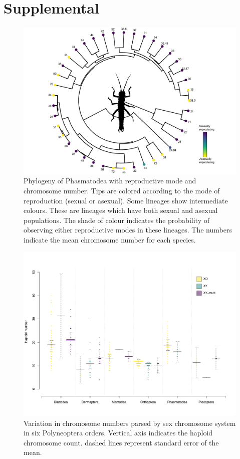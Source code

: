\section{Supplemental}
\vfill

\setcounter{figure}{0}
\renewcommand{\thefigure}{S\arabic{figure}}
\setcounter{table}{0}
\renewcommand{\thetable}{S\arabic{table}}

\begin{figure}[!ht]
\centering \includegraphics[width=1\textwidth]{figures/phasmatodea_phylogeny.pdf}
\caption{Phylogeny of Phasmatodea with reproductive mode and chromosome number. Tips are colored according to the mode of reproduction (sexual or asexual). Some lineages show intermediate colours. These are lineages which have both sexual and asexual populations. The shade of colour indicates the probability of observing either reproductive modes in these lineages. The numbers indicate the mean chromosome number for each species.}
\label{fig:phas.phylo}
\end{figure}

\begin{figure}
\centering \includegraphics[width=.7\textwidth]{figures/Preliminary_data.pdf}
\caption{
Variation in chromosome numbers parsed by sex chromosome system in six Polyneoptera orders. Vertical axis indicates the haploid chromosome count. dashed lines represent standard error of the mean.
}
\label{fig:order.plots}
\end{figure}

